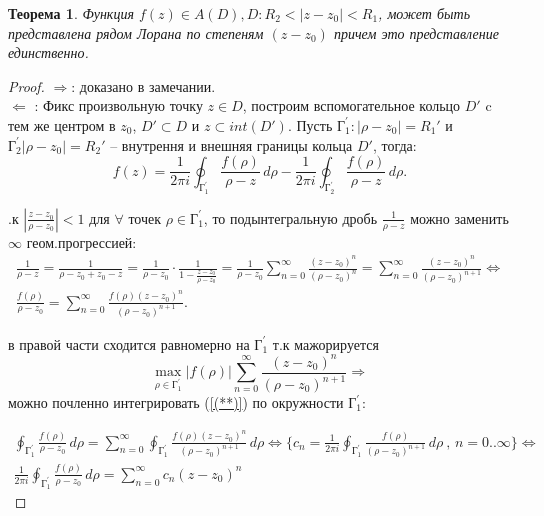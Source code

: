 \documentclass{article}
\newtheorem{theorem}{Теорема}
\begin{document}
\begin{theorem}
    Функция $f(z)\in A(D), D: R_2<|z-z_0|<R_1$, может быть представлена рядом Лорана по степеням $(z-z_0)$ причем это представление единственно.
\end{theorem}
\begin{proof}
$\Longrightarrow$: доказано в замечании.\\
$\Longleftarrow$ : Фикс произвольную точку $z \in D$, построим вспомогательное кольцо $D'$ c тем же центром в $z_0$, $D' \subset D$ и $z \subset int(D')$. Пусть $\text{Г}_1^{'}: |\rho - z_0|=R_1'$ и $\text{Г}_2^{'}|\rho - z_0|=R_2'$ -- внутрення и внешняя границы кольца $D'$, тогда: 
\begin{equation}
    f(z) = \frac{1}{2\pi i} \oint_{ \text{Г}_1^{'}} \frac{f(\rho)}{\rho - z} \,d\rho - \frac{1}{2\pi i} \oint_{ \text{Г}_2^{'}} \frac{f(\rho)}{\rho - z} \,d\rho.
    \label{(*)}
\end{equation}

.к $|\frac{z-z_0}{\rho-z_0}|<1$ для $\forall$ точек $\rho \in \text{Г}_1^{'}$, то подынтегральную дробь $\frac{1}{\rho-z}$ можно заменить $\infty$ геом.прогрессией:
\begin{equation}
\begin{gathered}
   \frac{1}{\rho-z} = \frac{1}{\rho-z_0+z_0-z}=\frac{1}{\rho-z_0}\cdot\frac{1}{1-\frac{z-z_0}{\rho-z_0}} = \frac{1}{\rho-z_0}\sum_{n=0}^{\infty}\frac{(z-z_0)^n}{(\rho-z_0)^n} = \sum_{n=0}^{\infty}\frac{(z-z_0)^n}{(\rho-z_0)^{n+1}} \Longleftrightarrow 
   \\
   \frac{f(\rho)}{\rho-z_0}=\sum_{n=0}^{\infty}\frac{f(\rho)(z-z_0)^n}{(\rho-z_0)^{n+1}}.
\end{gathered}
    \label{(**)}
\end{equation}


 в правой части сходится равномерно на $\text{Г}_1^{'}$ т.к мажорируется $$\max_{\rho \in \text{Г}_1^{'}}|f(\rho)|\sum_{n=0}^{\infty}\frac{(z-z_0)^n}{(\rho-z_0)^{n+1}} \Rightarrow$$ можно почленно интегрировать (\ref{(**)}) по окружности $\text{Г}_1^{'}$:

\begin{equation}
\begin{gathered}
    \oint_{ \text{Г}_1^{'}}\frac{f(\rho)}{\rho-z_0} \,d\rho =\sum_{n=0}^{\infty} \oint_{ \text{Г}_1^{'}} \frac{f(\rho)(z-z_0)^n}{(\rho-z_0)^{n+1}} \,d\rho \Longleftrightarrow \{ c_n = \frac{1}{2\pi i} \oint_{ \text{Г}_1^{'}} \frac{f(\rho)}{(\rho-z_0)^{n+1}} \,d\rho\ \text{, }n=0..\infty\}\Longleftrightarrow 
    \\
    \frac{1}{2\pi i}\oint_{ \text{Г}_1^{'}}\frac{f(\rho)}{\rho-z_0} \,d\rho = \sum_{n=0}^{\infty}c_n(z-z_0)^n
\end{gathered}
    \label{(****)}
\end{equation}




\end{proof}
\end{document}
